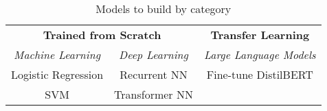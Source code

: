\begin{table}[!ht]
\centering
	\begin{tabular}{ccc}
		\toprule

		\multicolumn{2}{c}{\textbf{Trained from Scratch}} & \textbf{Transfer Learning}\\
		\cmidrule(r){1-2} \cmidrule(l){3-3}
		\emph{Machine Learning} & \emph{Deep Learning} & \emph{Large Language Models}\\
		\midrule
		Logistic Regression & Recurrent NN & Fine-tune DistilBERT \\
		SVM & Transformer NN & \\
		\bottomrule		
	\end{tabular}
	\caption{Models to build by category}
	\label{table-models-to-build}
\end{table}
